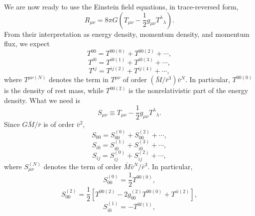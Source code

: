 We are now ready to use the Einstein field equations, in trace-reversed form,
\begin{equation}
  R_{\mu\nu}
  =
  8\pi G\left(T_{\mu\nu}-\frac12g_{\mu\nu}T^\lambda{}_\lambda\right).
  \tag{9.1.41}\label{eq:9.1.41}
\end{equation}
From their interpretation as energy density, momentum density, and momentum
flux, we expect
\begin{equation}
  T^{00}=T^{00(0)}+T^{00(2)}+\cdots,
  \tag{9.1.42}\label{eq:9.1.42}
\end{equation}
\begin{equation}
  T^{i0}=T^{i0(1)}+T^{i0(3)}+\cdots,
  \tag{9.1.43}\label{eq:9.1.43}
\end{equation}
\begin{equation}
  T^{ij}=T^{ij(2)}+T^{ij(4)}+\cdots,
  \tag{9.1.44}\label{eq:9.1.44}
\end{equation}
where \(T^{\mu\nu(N)}\) denotes the term in \(T^{\mu\nu}\) of order
\((\bar M/\bar r^3)\bar v^N\). In particular, \(T^{00(0)}\) is the
density of rest mass, while \(T^{00(2)}\) is the nonrelativistic part of
the energy density. What we need is
\begin{equation}
  S_{\mu\nu}\equiv
  T_{\mu\nu}-\frac12g_{\mu\nu}T^\lambda{}_\lambda.
  \tag{9.1.45}\label{eq:9.1.45}
\end{equation}
Since \(G\bar M/\bar r\) is of order \(\bar v^2\),
\begin{equation}
  S_{00}=S_{00}^{(0)}+S_{00}^{(2)}+\cdots,
  \tag{9.1.46}\label{eq:9.1.46}
\end{equation}
\begin{equation}
  S_{i0}=S_{i0}^{(1)}+S_{i0}^{(3)}+\cdots,
  \tag{9.1.47}\label{eq:9.1.47}
\end{equation}
\begin{equation}
  S_{ij}=S_{ij}^{(0)}+S_{ij}^{(2)}+\cdots,
  \tag{9.1.48}\label{eq:9.1.48}
\end{equation}
where \(S_{\mu\nu}^{(N)}\) denotes the term of order
\(\bar M\bar v^N/\bar r^3\). In particular,
\begin{equation}
  S_{00}^{(0)}=\frac12T^{00(0)},
  \tag{9.1.49}\label{eq:9.1.49}
\end{equation}
\begin{equation}
  S_{00}^{(2)}
  =
  \frac12\left[
    T^{00(2)}
    -2g_{00}^{(2)}T^{00(0)}
    +T^{ii(2)}
  \right],
  \tag{9.1.50}\label{eq:9.1.50}
\end{equation}
\begin{equation}
  S_{i0}^{(1)}=-T^{0\ii(1)},
  \tag{9.1.51}\label{eq:9.1.51}
\end{equation}

